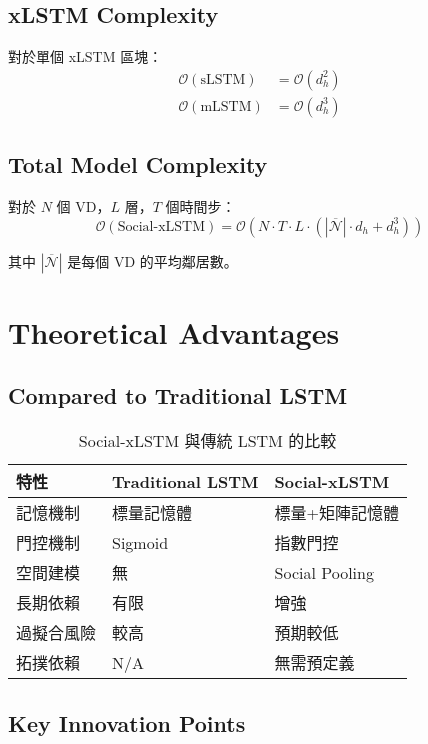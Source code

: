 \documentclass[11pt,a4paper]{article}
\begin{document}
\subsection{xLSTM Complexity}

對於單個 xLSTM 區塊：
\begin{align}
\mathcal{O}(\text{sLSTM}) &= \mathcal{O}(d_h^2) \\
\mathcal{O}(\text{mLSTM}) &= \mathcal{O}(d_h^3)
\end{align}

\subsection{Total Model Complexity}

對於 $N$ 個 VD，$L$ 層，$T$ 個時間步：
\begin{equation}
\mathcal{O}(\text{Social-xLSTM}) = \mathcal{O}(N \cdot T \cdot L \cdot (|\overline{\mathcal{N}}| \cdot d_h + d_h^3))
\end{equation}

其中 $|\overline{\mathcal{N}}|$ 是每個 VD 的平均鄰居數。

\section{Theoretical Advantages}

\subsection{Compared to Traditional LSTM}

\begin{table}[h]
\centering
\begin{tabular}{|l|l|l|}
\hline
特性 & Traditional LSTM & Social-xLSTM \\
\hline
記憶機制 & 標量記憶體 & 標量+矩陣記憶體 \\
門控機制 & Sigmoid & 指數門控 \\
空間建模 & 無 & Social Pooling \\
長期依賴 & 有限 & 增強 \\
過擬合風險 & 較高 & 預期較低 \\
拓撲依賴 & N/A & 無需預定義 \\
\hline
\end{tabular}
\caption{Social-xLSTM 與傳統 LSTM 的比較}
\end{table}

\subsection{Key Innovation Points}
\end{document}
